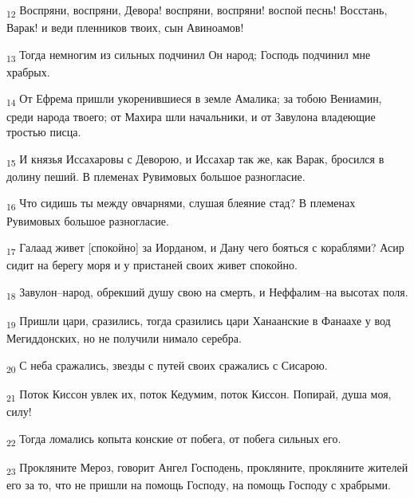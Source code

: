 \begin{tcolorbox}
\textsubscript{12} Воспряни, воспряни, Девора! воспряни, воспряни! воспой песнь! Восстань, Варак! и веди пленников твоих, сын Авиноамов!
\end{tcolorbox}
\begin{tcolorbox}
\textsubscript{13} Тогда немногим из сильных подчинил Он народ; Господь подчинил мне храбрых.
\end{tcolorbox}
\begin{tcolorbox}
\textsubscript{14} От Ефрема пришли укоренившиеся в земле Амалика; за тобою Вениамин, среди народа твоего; от Махира шли начальники, и от Завулона владеющие тростью писца.
\end{tcolorbox}
\begin{tcolorbox}
\textsubscript{15} И князья Иссахаровы с Деворою, и Иссахар так же, как Варак, бросился в долину пеший. В племенах Рувимовых большое разногласие.
\end{tcolorbox}
\begin{tcolorbox}
\textsubscript{16} Что сидишь ты между овчарнями, слушая блеяние стад? В племенах Рувимовых большое разногласие.
\end{tcolorbox}
\begin{tcolorbox}
\textsubscript{17} Галаад живет [спокойно] за Иорданом, и Дану чего бояться с кораблями? Асир сидит на берегу моря и у пристаней своих живет спокойно.
\end{tcolorbox}
\begin{tcolorbox}
\textsubscript{18} Завулон--народ, обрекший душу свою на смерть, и Неффалим--на высотах поля.
\end{tcolorbox}
\begin{tcolorbox}
\textsubscript{19} Пришли цари, сразились, тогда сразились цари Ханаанские в Фанаахе у вод Мегиддонских, но не получили нимало серебра.
\end{tcolorbox}
\begin{tcolorbox}
\textsubscript{20} С неба сражались, звезды с путей своих сражались с Сисарою.
\end{tcolorbox}
\begin{tcolorbox}
\textsubscript{21} Поток Киссон увлек их, поток Кедумим, поток Киссон. Попирай, душа моя, силу!
\end{tcolorbox}
\begin{tcolorbox}
\textsubscript{22} Тогда ломались копыта конские от побега, от побега сильных его.
\end{tcolorbox}
\begin{tcolorbox}
\textsubscript{23} Прокляните Мероз, говорит Ангел Господень, прокляните, прокляните жителей его за то, что не пришли на помощь Господу, на помощь Господу с храбрыми.
\end{tcolorbox}
